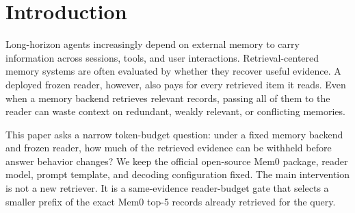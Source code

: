 \documentclass{article}
\begin{document}

\printAffiliationsAndNotice{}

\begin{abstract}
Long-horizon agents can spend many reader tokens on redundant retrieved memories. We study a same-evidence reader-budget gate for the official open-source Mem0 package: the memory backend retrieves five records, and a deterministic risk rule chooses whether the frozen reader receives one or three of those exact records. On 311 LongMemEval questions in a low-accuracy constrained OSS setup, this adaptive gate answers 61/311 cases versus 62/311 for Mem0 top-5, while reducing reader tokens by 37.0\% and reader-visible retrieved-context tokens by 53.3\%. By comparison, fixed top-1 saves more tokens but falls to 50/311, fixed top-2 reaches 54/311, fixed top-3 reaches 60/311, and a matched-budget random top-1/top-3 route reaches 56/311. These results support a constrained token-savings claim for budgeted reader context, not a reproduction of Mem0 platform accuracy or a claim that the memory backend improves answer quality.
\end{abstract}

\section{Introduction}

Long-horizon agents increasingly depend on external memory to carry information across sessions, tools, and user interactions. Retrieval-centered memory systems are often evaluated by whether they recover useful evidence. A deployed frozen reader, however, also pays for every retrieved item it reads. Even when a memory backend retrieves relevant records, passing all of them to the reader can waste context on redundant, weakly relevant, or conflicting memories.

This paper asks a narrow token-budget question: under a fixed memory backend and frozen reader, how much of the retrieved evidence can be withheld before answer behavior changes? We keep the official open-source Mem0 package, reader model, prompt template, and decoding configuration fixed. The main intervention is not a new retriever. It is a same-evidence reader-budget gate that selects a smaller prefix of the exact Mem0 top-5 records already retrieved for the query.
\end{document}
